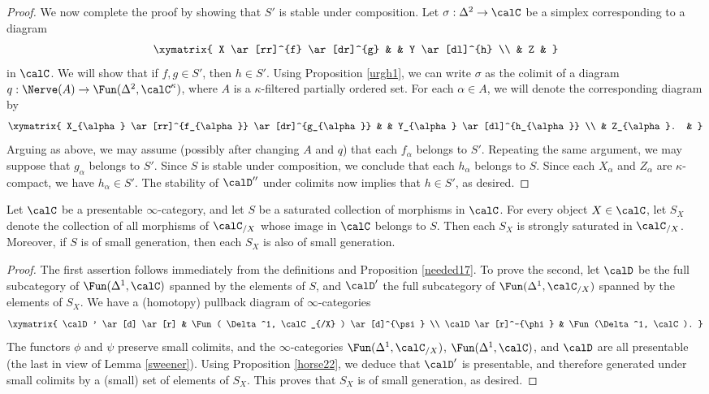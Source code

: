 \begin{proof}
We now complete the proof by showing that $S'$ is stable under composition.
Let $\sigma: \Delta^2 \rightarrow \calC$ be a simplex corresponding to a diagram
$$ \xymatrix{ X \ar[rr]^{f} \ar[dr]^{g} & & Y \ar[dl]^{h} \\
& Z & }$$
in $\calC$. We will show that if $f,g \in S'$, then $h \in S'$. Using Proposition \ref{urgh1}, we can write $\sigma$ as the colimit of a diagram $q: \Nerve(A) \rightarrow \Fun(\Delta^2,\calC^{\kappa})$, where
$A$ is a $\kappa$-filtered partially ordered set. For each $\alpha \in A$, we will denote the
corresponding diagram by
$$ \xymatrix{ X_{\alpha} \ar[rr]^{f_{\alpha}} \ar[dr]^{g_{\alpha}} & & Y_{\alpha} \ar[dl]^{h_{\alpha}} \\
& Z_{\alpha}. & }$$
Arguing as above, we may assume (possibly after changing $A$ and $q$) that each
$f_{\alpha}$ belongs to $S'$. Repeating the same argument, we may suppose that
$g_{\alpha}$ belongs to $S'$. Since $S$ is stable under composition, we conclude that each
$h_{\alpha}$ belongs to $S$. Since each $X_{\alpha}$ and $Z_{\alpha}$ are $\kappa$-compact, we have $h_{\alpha} \in S'$. The stability of $\calD''$ under colimits now implies that $h \in S'$, as desired.
\end{proof}

\begin{lemma}\label{swunl}
Let $\calC$ be a presentable $\infty$-category, and let $S$ be a saturated collection of morphisms in $\calC$. For every object $X \in \calC$, let
$S_X$ denote the collection of all morphisms of $\calC_{/X}$ whose image in $\calC$ belongs to $S$. Then each $S_{X}$ is strongly saturated in $\calC_{/X}$. Moreover, if $S$ is of small generation, then each $S_{X}$ is also of small generation.
\end{lemma}

\begin{proof}
The first assertion follows immediately from the definitions and Proposition \ref{needed17}.
To prove the second, let $\calD$ be the full subcategory of $\Fun( \Delta^1, \calC)$ spanned by the elements of $S$, and $\calD'$ the full subcategory of $\Fun( \Delta^1, \calC_{/X})$ spanned by the elements of $S_X$. We have a (homotopy) pullback diagram of $\infty$-categories
$$ \xymatrix{ \calD' \ar[d] \ar[r] & \Fun( \Delta^1, \calC_{/X} ) \ar[d]^{\psi} \\
\calD \ar[r]^-{\phi} & \Fun(\Delta^1, \calC). }$$
The functors $\phi$ and $\psi$ preserve small colimits, and the $\infty$-categories
$\Fun( \Delta^1, \calC_{/X})$, $\Fun( \Delta^1, \calC)$, and $\calD$ are all presentable
(the last in view of Lemma \ref{sweener}). Using Proposition \ref{horse22}, we deduce that $\calD'$ is presentable, and therefore generated under small colimits by a (small) set of elements of $S_{X}$. This proves that $S_{X}$ is of small generation, as desired.
\end{proof}

